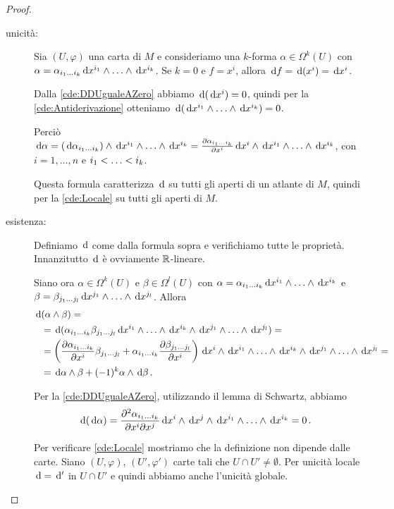 \begin{proof}
	\begin{description}
		\item [unicità:] Sia $(U,\varphi)$ una carta di $M$ e consideriamo una $k$-forma $\alpha\in\Omega^k(U)$ con $\alpha = \alpha_{\seqb ik{}} \de x^{i_1} \wedge \ldots \wedge \de x^{i_k}$.
		Se $k=0$ e $f=x^i$, allora $\de f = \de(x^i) = \de x^i$.
		
		Dalla \ref{cde:DDUgualeAZero} abbiamo $\de(\de x^i) = 0$, quindi per la \ref{cde:Antiderivazione} otteniamo $\de(\de x^{i_1} \wedge \ldots \wedge \de x^{i_k}) = 0$.
		
		Perciò $\de\alpha = (\de \alpha_{\seqb ik{}}) \wedge \de x^{i_1} \wedge \ldots\wedge \de x^{i_k} = \DerParz{\alpha_{\seqb ik{}}} {x^i} \de x^i \wedge \de x^{i_1} \wedge\ldots \wedge \de x^{i_k}$, con $i=1,\ldots,n$ e $\seqb ik<$.
		
		Questa formula caratterizza $\de$ su tutti gli aperti di un atlante di $M$, quindi per la \ref{cde:Locale} su tutti gli aperti di $M$.
		
		\item [esistenza:] Definiamo $\de$ come dalla formula sopra e verifichiamo tutte le proprietà. Innanzitutto $\de$ è ovviamente $\R$-lineare.
		
		Siano ora $\alpha\in\Omega^k(U)$ e $\beta\in\Omega^l(U)$ con $\alpha = \alpha_{\seqb ik{}} \de x^{i_1} \wedge \ldots \wedge \de x^{i_k}$ e $\beta= \beta_{\seqb jl{}} \de x^{j_1} \wedge\ldots\wedge \de x^{j_l}$. Allora
		\begin{align*}
			\de& (\alpha \wedge \beta) =\\ 
			&= \de (\alpha_{\seqb ik{}} \beta_{\seqb jl{}} \de x^{i_1} \wedge\ldots\wedge \de x^{i_k}\wedge \de x^{j_1} \wedge\ldots\wedge \de x^{j_l}) =\\
			&= \left(\DerParz{\alpha_{\seqb ik{}}}{x^i} \beta_{\seqb jl{}} + \alpha_{\seqb ik{}} \DerParz{\beta_{\seqb jl{}}}{x^i} \right) \de x^i\wedge\de x^{i_1} \wedge\ldots\wedge \de x^{i_k}\wedge \de x^{j_1} \wedge\ldots\wedge \de x^{j_l} = \\
			&=\de \alpha \wedge \beta + (-1)^k \alpha \wedge \de \beta \punto
		\end{align*}
		
		Per la \ref{cde:DDUgualeAZero}, utilizzando il lemma di Schwartz, abbiamo
		\begin{equation*}
		\de(\de\alpha) = \frac{\partial^2 \alpha_{\seqb ik{}}}{\partial x^i \partial x^j} \de x^i\wedge\de x^j \wedge\de x^{i_1} \wedge\ldots\wedge \de x^{i_k} =0 \punto
		\end{equation*}
		
		Per verificare \ref{cde:Locale} mostriamo che la definizione non dipende dalle carte. Siano $(U,\varphi)$, $(U',\varphi')$ carte tali che $U\cap U' \not=\emptyset$. Per unicità locale $\de = \de'$ in $U\cap U'$ e quindi abbiamo anche l'unicità globale.
	\end{description}
\end{proof}

